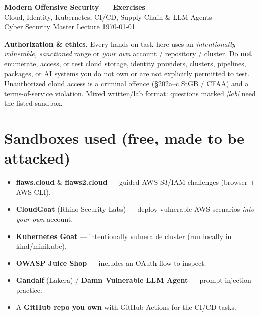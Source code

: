 \documentclass[11pt,a4paper]{article}
\begin{document}
\begin{center}
  {\LARGE\bfseries Modern Offensive Security --- Exercises}\\[0.4em]
  {\large Cloud, Identity, Kubernetes, CI/CD, Supply Chain \& LLM Agents}\\[0.4em]
  Cyber Security Master Lecture \hfill \today
\end{center}
\vspace{0.5em}

\begin{warn}
\textbf{Authorization \& ethics.} Every hands-on task here uses an
\emph{intentionally vulnerable, sanctioned} range or \emph{your own} account /
repository / cluster. Do \textbf{not} enumerate, access, or test cloud storage,
identity providers, clusters, pipelines, packages, or AI systems you do not own
or are not explicitly permitted to test. Unauthorized cloud access is a criminal
offence (\S202a--c StGB / CFAA) and a terms-of-service violation. Mixed
written/lab format: questions marked \emph{[lab]} need the listed sandbox.
\end{warn}

\bigskip
\section*{Sandboxes used (free, made to be attacked)}
\begin{lab}\small
\begin{itemize}[leftmargin=1.3em, itemsep=1pt]
  \item \textbf{flaws.cloud} \& \textbf{flaws2.cloud} --- guided AWS S3/IAM
        challenges (browser + AWS CLI).
  \item \textbf{CloudGoat} (Rhino Security Labs) --- deploy vulnerable AWS
        scenarios \emph{into your own} account.
  \item \textbf{Kubernetes Goat} --- intentionally vulnerable cluster (run
        locally in kind/minikube).
  \item \textbf{OWASP Juice Shop} --- includes an OAuth flow to inspect.
  \item \textbf{Gandalf} (Lakera) / \textbf{Damn Vulnerable LLM Agent} ---
        prompt-injection practice.
  \item A \textbf{GitHub repo you own} with GitHub Actions for the CI/CD tasks.
\end{itemize}
\end{lab}

\end{document}
